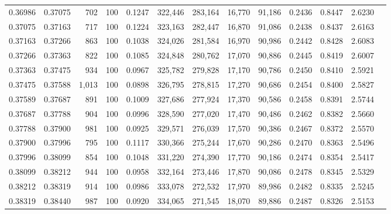 \begin{tabular}{rrrrrrrrrrrrr}
0.36986 & 0.37075 &   702 & 100 &                                     0.1247 & 322,446 & 283,164 &  16,770 &  91,186 & 0.2436 & 0.8447 & 2.6230 \\
0.37075 & 0.37163 &   717 & 100 &                                     0.1224 & 323,163 & 282,447 &  16,870 &  91,086 & 0.2438 & 0.8437 & 2.6163 \\
0.37163 & 0.37266 &   863 & 100 &                                     0.1038 & 324,026 & 281,584 &  16,970 &  90,986 & 0.2442 & 0.8428 & 2.6083 \\
0.37266 & 0.37363 &   822 & 100 &                                     0.1085 & 324,848 & 280,762 &  17,070 &  90,886 & 0.2445 & 0.8419 & 2.6007 \\
0.37363 & 0.37475 &   934 & 100 &                                     0.0967 & 325,782 & 279,828 &  17,170 &  90,786 & 0.2450 & 0.8410 & 2.5921 \\
0.37475 & 0.37588 & 1,013 & 100 &                                     0.0898 & 326,795 & 278,815 &  17,270 &  90,686 & 0.2454 & 0.8400 & 2.5827 \\
0.37589 & 0.37687 &   891 & 100 &                                     0.1009 & 327,686 & 277,924 &  17,370 &  90,586 & 0.2458 & 0.8391 & 2.5744 \\
0.37687 & 0.37788 &   904 & 100 &                                     0.0996 & 328,590 & 277,020 &  17,470 &  90,486 & 0.2462 & 0.8382 & 2.5660 \\
0.37788 & 0.37900 &   981 & 100 &                                     0.0925 & 329,571 & 276,039 &  17,570 &  90,386 & 0.2467 & 0.8372 & 2.5570 \\
0.37900 & 0.37996 &   795 & 100 &                                     0.1117 & 330,366 & 275,244 &  17,670 &  90,286 & 0.2470 & 0.8363 & 2.5496 \\
0.37996 & 0.38099 &   854 & 100 &                                     0.1048 & 331,220 & 274,390 &  17,770 &  90,186 & 0.2474 & 0.8354 & 2.5417 \\
0.38099 & 0.38212 &   944 & 100 &                                     0.0958 & 332,164 & 273,446 &  17,870 &  90,086 & 0.2478 & 0.8345 & 2.5329 \\
0.38212 & 0.38319 &   914 & 100 &                                     0.0986 & 333,078 & 272,532 &  17,970 &  89,986 & 0.2482 & 0.8335 & 2.5245 \\
0.38319 & 0.38440 &   987 & 100 &                                     0.0920 & 334,065 & 271,545 &  18,070 &  89,886 & 0.2487 & 0.8326 & 2.5153 \\

\end{tabular}
